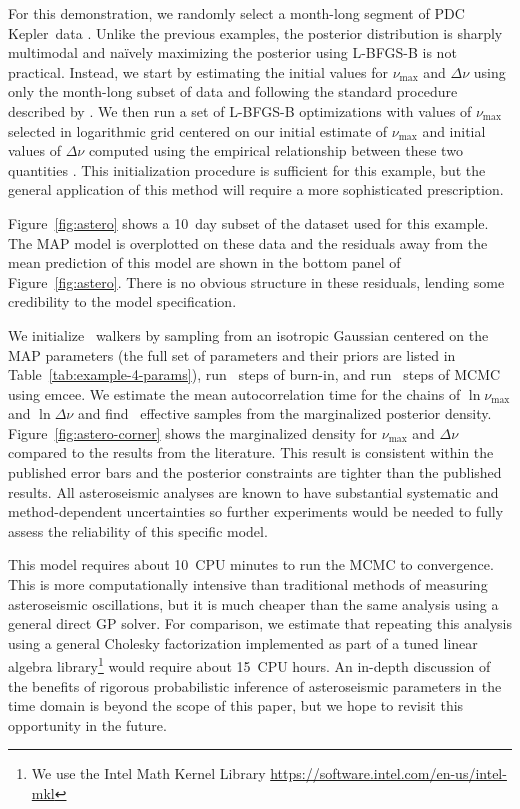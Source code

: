 \documentclass[manuscript, letterpaper]{aastex6}
\newcommand{\project}[1]{\textsf{#1}}
\newcommand{\kepler}{\project{Kepler}}
\newcommand{\emcee}{\project{emcee}}
\newcommand{\figureref}[1]{\ref{fig:#1}}
\newcommand{\Figure}[1]{Figure~\figureref{#1}}
\newcommand{\response}[1]{{\color{blue}#1}}
\begin{document}
\response{For this demonstration, we randomly select a month-long segment of
PDC \kepler\ data \citep{Stumpe:2012, Smith:2012}.
Unlike the previous examples, the posterior distribution is sharply
multimodal and na\"ively maximizing the posterior using \project{L-BFGS-B} is
not practical.
Instead, we start by estimating the initial values for $\nu_\mathrm{max}$ and
$\Delta\nu$ using only the month-long subset of data and following the
standard procedure described by \citet{Huber:2009}.
We then run a set of \project{L-BFGS-B} optimizations with values of
$\nu_\mathrm{max}$ selected in logarithmic grid centered on our initial
estimate of $\nu_\mathrm{max}$ and initial values of $\Delta\nu$ computed
using the empirical relationship between these two quantities
\citep{Stello:2009}.
This initialization procedure is sufficient for this example, but the general
application of this method will require a more sophisticated prescription.

\Figure{astero} shows a 10~day subset of the dataset used for this example.
The MAP model is overplotted on these data and the residuals away from the
mean prediction of this model are shown in the bottom panel of
\Figure{astero}.
There is no obvious structure in these residuals, lending some credibility to
the model specification.

We initialize \exampleivnwalkers~walkers by sampling from an isotropic
Gaussian centered on the MAP parameters (the full set of parameters and their
priors are listed in Table~\ref{tab:example-4-params}), run
\exampleivnburn~steps of burn-in, and run \exampleivnsteps~steps of MCMC using
\emcee.
We estimate the mean autocorrelation time for the chains of
$\ln\nu_\mathrm{max}$ and $\ln\Delta\nu$ and find \exampleivneff\ effective
samples from the marginalized posterior density.
\Figure{astero-corner} shows the marginalized density for $\nu_\mathrm{max}$
and $\Delta\nu$ compared to the results from the literature.
This result is consistent within the published error bars and the posterior
constraints are tighter than the published results.
All asteroseismic analyses are known to have substantial systematic and
method-dependent uncertainties \citep{Verner:2011} so further experiments
would be needed to fully assess the reliability of this specific model.

This model requires about 10~CPU minutes to run the MCMC to convergence.
This is more computationally intensive than traditional methods of measuring
asteroseismic oscillations, but it is much cheaper than the same analysis
using a general direct GP solver.
For comparison, we estimate that repeating this analysis using a general
Cholesky factorization implemented as part of a tuned linear algebra
library\footnote{We use the Intel Math Kernel Library
\url{https://software.intel.com/en-us/intel-mkl}} would require about 15~CPU
hours.
An in-depth discussion of the benefits of rigorous probabilistic inference of
asteroseismic parameters in the time domain is beyond the scope of this paper,
but we hope to revisit this opportunity in the future.
}
\end{document}
